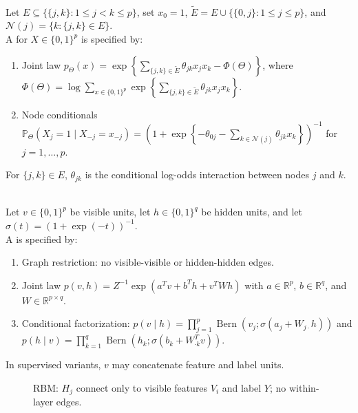 \begin{definition} \label{def:sl-ising-model} \\
Let $E\subseteq\{\{j,k\}:1\leq j<k\leq p\}$, set $x_0=1$, $\widetilde E=E\cup\{\{0,j\}:1\leq j\leq p\}$, and $\mathcal{N}(j)=\{k:\{j,k\}\in E\}$.\\
A  for $X\in\{0,1\}^p$ is specified by:
\begin{enumerate}[label=(\roman*)]
\setlength{\itemsep}{0pt}
\item Joint law $p_\Theta(x)=\exp\left\{\sum\limits_{\{j,k\}\in\widetilde E}\theta_{jk}x_jx_k-\Phi(\Theta)\right\}$, where $\Phi(\Theta)=\log\sum\limits_{x\in\{0,1\}^p}\exp\left\{\sum\limits_{\{j,k\}\in\widetilde E}\theta_{jk}x_jx_k\right\}$.
\item Node conditionals $\mathbb{P}_\Theta(X_j=1\mid X_{-j}=x_{-j})=\left(1+\exp\left\{-\theta_{0j}-\sum\limits_{k\in\mathcal{N}(j)}\theta_{jk}x_k\right\}\right)^{-1}$ for $j=1,\ldots,p$.
\end{enumerate}
For $\{j,k\}\in E$, $\theta_{jk}$ is the conditional log-odds interaction between nodes $j$ and $k$.
\end{definition}

\begin{definition} \label{def:sl-restricted-boltzmann-machine} \\
Let $v\in\{0,1\}^p$ be visible units, let $h\in\{0,1\}^q$ be hidden units, and let $\sigma(t)=(1+\exp(-t))^{-1}$.\\
A  is specified by:
\begin{enumerate}[label=(\roman*)]
\setlength{\itemsep}{0pt}
\item Graph restriction: no visible-visible or hidden-hidden edges.
\item Joint law $p(v,h)=Z^{-1}\exp(a^Tv+b^Th+v^TWh)$ with $a\in\mathbb{R}^p$, $b\in\mathbb{R}^q$, and $W\in\mathbb{R}^{p\times q}$.
\item Conditional factorization: $p(v\mid h)=\prod\limits_{j=1}^p\operatorname{Bern}(v_j;\sigma(a_j+W_{j\cdot}h))$ and $p(h\mid v)=\prod\limits_{k=1}^q\operatorname{Bern}(h_k;\sigma(b_k+W_{\cdot k}^Tv))$.
\end{enumerate}
In supervised variants, $v$ may concatenate feature and label units.
\end{definition}

\begin{figure}[H]
\centering

\caption{RBM: \textcolor{blue!50!black}{$H_j$} connect only to visible features \textcolor{green!50!black}{$V_i$} and label \textcolor{yellow!45!black}{$Y$}; no within-layer edges.}
\label{fig:sl-restricted-boltzmann-machine-layers}
\end{figure}

